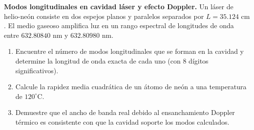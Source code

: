 \item \textbf{Modos longitudinales en cavidad láser y efecto Doppler.}
Un láser de helio-neón consiste en dos espejos planos y paralelos separados por $L = 35.124\text{ cm}$. El medio gaseoso amplifica luz en un rango espectral de longitudes de onda entre $632.80840\text{ nm}$ y $632.80980\text{ nm}$.
\begin{enumerate}
    \item Encuentre el número de modos longitudinales que se forman en la cavidad y determine la longitud de onda exacta de cada uno (con 8 dígitos significativos).
    \item Calcule la rapidez media cuadrática de un átomo de neón a una temperatura de $120^\circ\text{C}$.
    \item Demuestre que el ancho de banda real debido al ensanchamiento Doppler térmico es consistente con que la cavidad soporte los modos calculados.
\end{enumerate}